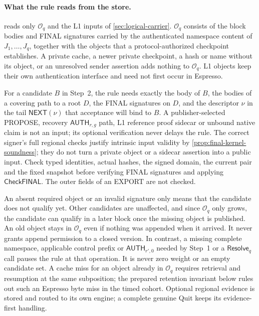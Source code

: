 \documentclass[11pt,a4paper]{article}
\newcommand{\tagg}[1]{\ensuremath{\mathsf{#1}}}
\newcounter{protocol}
\begin{document}
\paragraph{What the rule reads from the store.}
\label{sec:record-completeness}
 reads only $\mathcal O_q$ and the L1 inputs of
\cref{sec:logical-carrier}. $\mathcal O_q$ consists of the block bodies
and FINAL signatures carried by the authenticated namespace content of
$J_1,\ldots,J_q$, together with the objects that a protocol-authorized
checkpoint establishes. A private cache, a newer private checkpoint, a
hash or name without its object, or an unresolved sender assertion adds
nothing to $\mathcal O_q$. L1 objects keep their own authentication
interface and need not first occur in Espresso.

For a candidate $B$ in Step~2, the rule needs exactly the body of $B$,
the bodies of a covering path to a root $D$, the FINAL signatures on
$D$, and the descriptor $\nu$ in the tail $\tagg{NEXT}(\nu)$ that
acceptance will bind to
$B$. A publisher-selected PROPOSE,
recovery $\tagg{AUTH}_{r,g}$ path, L1 reference proof sidecar or unbound
native claim is not an input; its optional verification never delays the
rule. The correct signer's full regional checks justify intrinsic input
validity by \cref{prop:final-kernel-soundness}; they do not turn a
private object or a sidecar assertion into a public input. Check typed
identities, actual hashes, the signed domain, the current pair and the
fixed snapshot before verifying FINAL signatures and applying
\tagg{CheckFINAL}. The outer fields of an EXPORT are not checked.

An absent required object or an invalid signature only means that the
candidate does not qualify yet. Other candidates are unaffected, and
since $\mathcal O_q$ only grows, the candidate can qualify in a later
block once the missing object is published. An old object stays in
$\mathcal O_q$ even if nothing was appended when it arrived. It never
grants append permission to a closed version. In contrast, a missing
complete namespace, applicable control prefix or $\tagg{AUTH}_{r',0}$
needed by Step~1 or a $\tagg{Resolve}_q$ call pauses the rule at that
operation. It is never zero
weight or an empty candidate set. A cache miss for an object already in
$\mathcal O_q$ requires retrieval and resumption at the same
subposition; the prepared retention invariant below rules out such an
Espresso byte miss in the timed cohort. Optional regional evidence is
stored and routed to its own engine; a complete genuine Quit keeps its
evidence-first handling.
\end{document}

